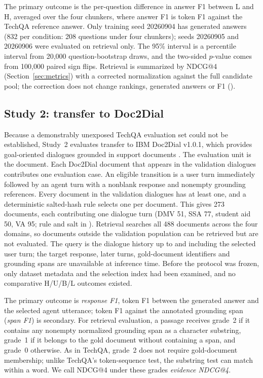 The primary outcome is the per-question difference in answer F1 between L and H, averaged over the four chunkers, where answer F1 is token F1 against the TechQA reference answer. Only training seed 20260904 has generated answers (832 per condition: 208 questions under four chunkers); seeds 20260905 and 20260906 were evaluated on retrieval only. The 95\% interval is a percentile interval from 20,000 question-bootstrap draws, and the two-sided $p$-value comes from 100,000 paired sign flips. Retrieval is summarized by NDCG@4 (Section~\ref{sec:metrics}) with a corrected normalization against the full candidate pool; the correction does not change rankings, generated answers or F1 ().

\subsection{Study 2: transfer to Doc2Dial}\label{sec:study2}
Because a demonstrably unexposed TechQA evaluation set could not be established, Study~2 evaluates transfer to IBM Doc2Dial v1.0.1, which provides goal-oriented dialogues grounded in support documents \citep{feng2020}. The evaluation unit is the document. Each Doc2Dial document that appears in the validation dialogues contributes one evaluation case. An eligible transition is a user turn immediately followed by an agent turn with a nonblank response and nonempty grounding references. Every document in the validation dialogues has at least one, and a deterministic salted-hash rule selects one per document. This gives 273 documents, each contributing one dialogue turn (DMV 51, SSA 77, student aid 50, VA 95; rule and salt in ). Retrieval searches all 488 documents across the four domains, so documents outside the validation population can be retrieved but are not evaluated. The query is the dialogue history up to and including the selected user turn; the target response, later turns, gold-document identifiers and grounding spans are unavailable at inference time. Before the protocol was frozen, only dataset metadata and the selection index had been examined, and no comparative H/U/B/L outcomes existed.

The primary outcome is \emph{response F1}, token F1 between the generated answer and the selected agent utterance; token F1 against the annotated grounding span (\emph{span F1}) is secondary. For retrieval evaluation, a passage receives grade~2 if it contains any nonempty normalized grounding span as a character substring, grade~1 if it belongs to the gold document without containing a span, and grade~0 otherwise. As in TechQA, grade~2 does not require gold-document membership; unlike TechQA's token-sequence test, the substring test can match within a word. We call NDCG@4 under these grades \emph{evidence NDCG@4}.

